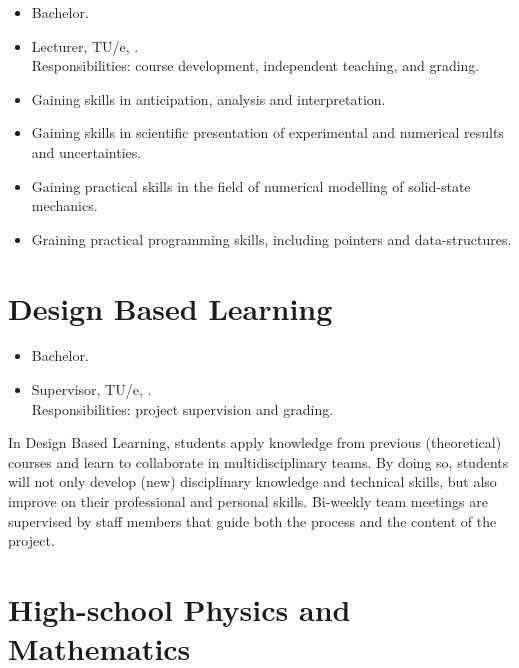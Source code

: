 \documentclass{goose-article}
\begin{document}
\begin{tcolorbox}
    \begin{itemize}
        \item Bachelor.
        \item Lecturer, TU/e, \MyDateTeachingTUeProgramming.
        \\
        Responsibilities: course development, independent teaching, and grading.
    \end{itemize}
\end{tcolorbox}

\begin{itemize}
    \item Gaining skills in anticipation, analysis and interpretation.
    \item Gaining skills in scientific presentation of experimental and numerical results and uncertainties.
    \item Gaining practical skills in the field of numerical modelling of solid-state mechanics.
    \item Graining practical programming skills, including pointers and data-structures.
\end{itemize}

\section*{Design Based Learning}

\begin{tcolorbox}
    \begin{itemize}
        \item Bachelor.
        \item Supervisor, TU/e, \MyDateTeachingTUeDBL.
        \\
        Responsibilities: project supervision and grading.
    \end{itemize}
\end{tcolorbox}

\noindent
In Design Based Learning, students apply knowledge from previous (theoretical) courses and learn to collaborate in multidisciplinary teams.
By doing so, students will not only develop (new) disciplinary knowledge and technical skills, but also improve on their professional and personal skills.
Bi-weekly team meetings are supervised by staff members that guide both the process and the content of the project.

\section*{High-school Physics and Mathematics}
\end{document}
